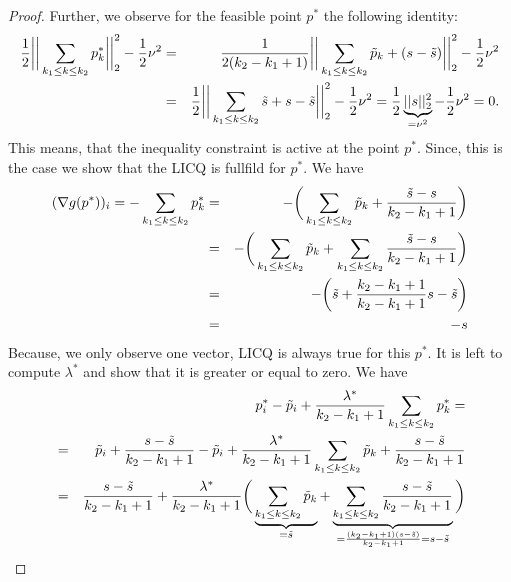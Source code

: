\begin{proof}
        Further, we observe for the feasible point $p^{\ast}$ the following identity:
            \begin{eqnarray}
                \frac{1}{2} \bigg|\bigg|\sum_{k_{1} \le k \le k_{2}} p^{\ast}_{k}\bigg|\bigg|_{2}^{2} - \frac{1}{2} \nu^{2} &=& \frac{1}{2(k_{2} - k_{1} + 1)} \bigg|\bigg|\sum_{k_{1} \le k \le k_{2}} \tilde{p}_{k} + (s - \tilde{s})\bigg|\bigg|_{2}^{2} - \frac{1}{2} \nu^{2} \notag \\
                &=& \frac{1}{2} \bigg|\bigg|\sum_{k_{1} \le k \le k_{2}} \tilde{s} + s - \tilde{s}\bigg|\bigg|_{2}^{2} - \frac{1}{2} \nu^{2} = \frac{1}{2} \underbrace{||s||_{2}^{2}}_{= \nu^{2}} - \frac{1}{2} \nu^{2} = 0. \notag
            \end{eqnarray}
        This means, that the inequality constraint is active at the point $p^{\ast}$. Since, this is the case we show that the LICQ is fullfild for $p^{\ast}$. We have
            \begin{eqnarray}
                (\nabla g(p^{\ast}))_{i} = - \sum_{k_{1} \le k \le k_{2}} p^{\ast}_{k} &=& - \bigg( \sum_{k_{1} \le k \le k_{2}} \tilde{p}_{k} + \frac{\tilde{s} - s}{k_{2} - k_{1} + 1} \bigg) \notag \\
                &=& - \bigg( \sum_{k_{1} \le k \le k_{2}} \tilde{p}_{k} + \sum_{k_{1} \le k \le k_{2}} \frac{\tilde{s} - s}{k_{2} - k_{1} + 1} \bigg) \notag \\
                &=& - \bigg( \tilde{s} + \frac{k_{2} - k_{1} + 1}{k_{2} - k_{1} + 1} s - \tilde{s} \bigg) \notag \\
                &=& - s
            \end{eqnarray}
        Because, we only observe one vector, LICQ is always true for this $p^{\ast}$. It is left to compute $\lambda^{\ast}$ and show that it is greater or equal to zero. We have
            \begin{eqnarray}
                    &&p^{\ast}_{i} - \tilde{p}_{i} + \frac{\lambda^{\ast}}{k_{2} - k_{1} + 1} \sum_{k_{1} \le k \le k_{2}} p^{\ast}_{k} = \notag \\
                    &=& \tilde{p}_{i} + \frac{s - \tilde{s}}{k_{2} - k_{1} + 1} - \tilde{p}_{i} + \frac{\lambda^{\ast}}{k_{2} - k_{1} + 1} \sum_{k_{1} \le k \le k_{2}} \tilde{p}_{k} + \frac{s - \tilde{s}}{k_{2} - k_{1} + 1} \notag \\
                    &=& \frac{s - \tilde{s}}{k_{2} - k_{1} + 1} + \frac{\lambda^{\ast}}{k_{2} - k_{1} + 1} \bigg( \underbrace{\sum_{k_{1} \le k \le k_{2}} \tilde{p}_{k}}_{= \tilde{s}} + \underbrace{\sum_{k_{1} \le k \le k_{2}} \frac{s - \tilde{s}}{k_{2} - k_{1} + 1}}_{= \frac{(k_{2} - k_{1} + 1) (s - \tilde{s})}{k_{2} - k_{1} + 1} = s - \tilde{s}} \bigg) \notag \\

\end{eqnarray}
\end{proof}
